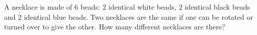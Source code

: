 A necklace is made of $6$ beads: $2$ identical white beads, $2$ identical black beads and $2$ identical blue beads. Two necklaces are the same if one can be rotated or turned over to give the other. How many different necklaces are there?
